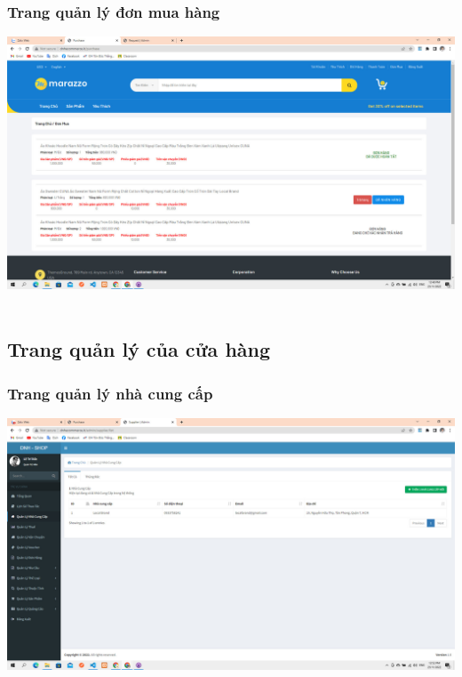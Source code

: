 \documentclass[12pt,a4paper,2sides]{report}
\begin{document}
\subsubsection{Trang quản lý đơn mua hàng}
    \includegraphics[width=1\linewidth]{lib/results/khquanlydonmua.jpg}\\\vspace*{1cm} 
    \hspace{5cm}{Hình 43. Trang quản lý đơn mua hàng}\\
\subsection{Trang quản lý của cửa hàng}
\subsubsection{Trang quản lý nhà cung cấp}
    \includegraphics[width=1\linewidth]{lib/results/quanlyncc.jpg}\\\vspace*{1cm}   
    \hspace{5cm}{Hình 44. Trang quản lý nhà cung cấp}\\
\end{document}
